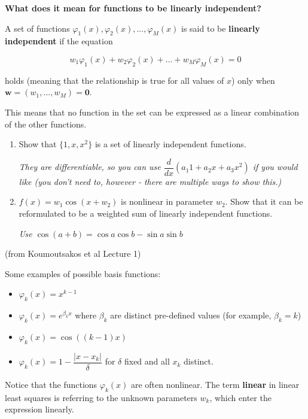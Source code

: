 \documentclass[12pt,letterpaper,noanswers]{exam}
\newcommand{\vc}[1]{\boldsymbol{#1}}
\begin{document}
\noindent\textbf{What does it mean for functions to be linearly independent?}
\begin{tcolorbox}

A set of functions $\varphi_1(x), \varphi_2(x),...,\varphi_M(x)$ is said to be \textbf{linearly independent} if the equation

\[\displaystyle w_1 \varphi_1(x) + w_2\varphi_2(x) + ... + w_M \varphi_M(x) = 0\]

holds (meaning that the relationship is true for all values of $x$) only when $\vc{w} = (w_1,...,w_M) = \vc{0}$.  

This means that no function in the set can be expressed as a linear combination of the other functions.

\end{tcolorbox}
\begin{enumerate}[resume=classQ]
    \item Show that $\{1, x, x^2\}$ is a set of linearly independent functions.
    
    \emph{They are differentiable, so you can use $\dfrac{d}{dx}(a_1 1 + a_2 x + a_3 x^2)$ if you would like (you don't need to, however - there are multiple ways to show this.)}
    
    \item $f(x) = w_1\cos(x + w_2)$ is nonlinear in parameter $w_2$.  Show that it can be reformulated to be a weighted sum of linearly independent functions.
    
    \emph{Use $\cos(a+b) = \cos a\cos b - \sin a\sin b$}
\end{enumerate}

\begin{tcolorbox}
(from Koumoutsakos et al Lecture 1)

Some examples of possible basis functions:
\begin{itemize}
\itemsep0pt
    \item $\varphi_k(x)=x^{k-1}$
    \item $\varphi_k(x)=e^{\beta_k x}$ where $\beta_k$ are distinct pre-defined values (for example, $\beta_k = k$)
    \item $\varphi_k(x) = \cos\left((k-1)x\right)$
    \item $\varphi_k(x) = 1 -\dfrac{\vert x - x_k\vert}{\delta}$ for $\delta$ fixed and all $x_k$ distinct.
\end{itemize}

Notice that the functions $\varphi_k(x)$ are often nonlinear.  The term \textbf{linear} in linear least squares is referring to the unknown parameters $w_k$, which enter the expression linearly.
\end{tcolorbox}
\end{document}
